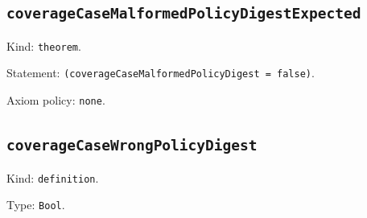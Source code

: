 \documentclass[11pt]{article}
\begin{document}
\subsection*{\texttt{coverageCaseMalformedPolicyDigestExpected}}
\noindent Kind: \texttt{theorem}.\par
\noindent Statement: \texttt{(coverageCaseMalformedPolicyDigest = false)}.\par
\noindent Axiom policy: \texttt{none}.\par
\subsection*{\texttt{coverageCaseWrongPolicyDigest}}
\noindent Kind: \texttt{definition}.\par
\noindent Type: \texttt{Bool}.\par
\end{document}
